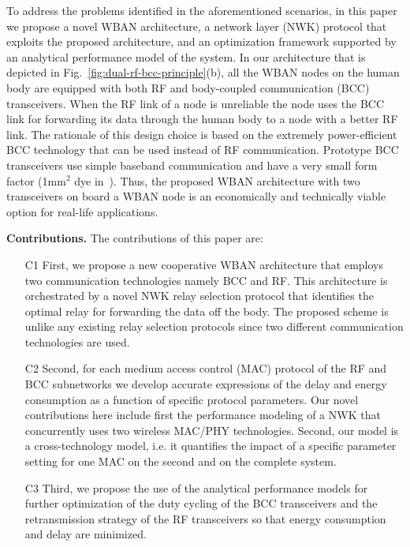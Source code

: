 \documentclass[10pt]{IEEEtran}
\begin{document}
To address the problems identified in the aforementioned scenarios, in this paper we propose a novel WBAN architecture, a network layer (NWK) protocol that exploits the proposed architecture, and an optimization framework supported by an analytical performance model of the system. In our architecture that is depicted in Fig.~\ref{fig:dual-rf-bcc-principle}(b), all the WBAN nodes on the human body are equipped with both RF and body-coupled communication (BCC) transceivers. When the RF link of a node is unreliable the node uses the BCC link for forwarding its data through the human body to a node with a better RF link. The rationale of this design choice is based on the extremely power-efficient BCC technology that can be used instead of RF communication. Prototype BCC transceivers use simple baseband communication and have a very small form factor (1mm$^2$ dye in~\cite{fazzi09}). Thus, the proposed WBAN architecture with two transceivers on board a WBAN node is an economically and technically viable option for real-life applications.

\textbf{Contributions.} The contributions of this paper are:
\begin{itemize}
\item[C1] First, we propose a new cooperative WBAN architecture that employs two communication technologies namely BCC and RF. This architecture is orchestrated by a novel NWK relay selection protocol that identifies the optimal relay for forwarding the data off the body. The proposed scheme is unlike any existing relay selection protocols since two different communication technologies are used.
\item[C2] Second, for each medium access control (MAC) protocol of the RF and BCC subnetworks we develop accurate expressions of the delay and energy consumption as a function of specific protocol parameters.
Our novel contributions here include first the performance modeling of a NWK that concurrently uses two wireless MAC/PHY technologies. Second, our model is a cross-technology model, i.e. it quantifies the impact of a specific parameter setting for one MAC on the second and on the complete system.
\item[C3] Third, we propose the use of the analytical performance models for further optimization of the duty cycling of the BCC transceivers and the retransmission strategy of the RF transceivers so that energy consumption and delay are minimized.
\end{itemize}
\end{document}
